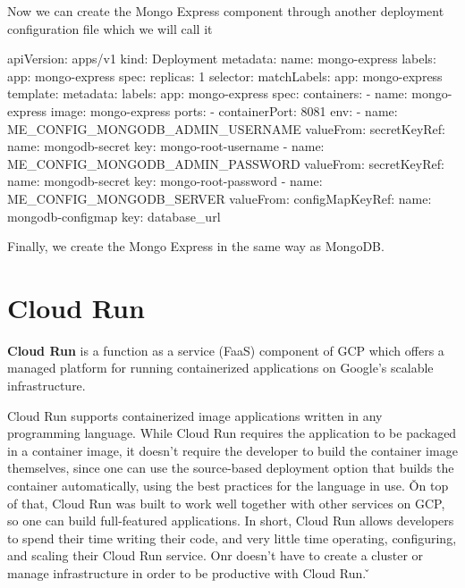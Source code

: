 Now we can create the Mongo Express component through another deployment configuration file which we will call it
\begin{block}
apiVersion: apps/v1
kind: Deployment
metadata:
  name: mongo-express
  labels:
    app: mongo-express
spec:
  replicas: 1
  selector:
    matchLabels:
      app: mongo-express
  template:
    metadata:
      labels:
        app: mongo-express
    spec:
      containers:
      - name: mongo-express
        image: mongo-express
        ports:
        - containerPort: 8081
        env:
        - name: ME_CONFIG_MONGODB_ADMIN_USERNAME
          valueFrom:
            secretKeyRef:
              name: mongodb-secret
              key: mongo-root-username
        - name: ME_CONFIG_MONGODB_ADMIN_PASSWORD
          valueFrom:
            secretKeyRef:
              name: mongodb-secret
              key: mongo-root-password
        - name: ME_CONFIG_MONGODB_SERVER
          valueFrom:
            configMapKeyRef:
              name: mongodb-configmap
              key: database_url
\end{block}

Finally, we create the Mongo Express in the same way as MongoDB\@.


\section{Cloud Run}

\textbf{Cloud Run} is a function as a service (FaaS) component of GCP which offers a managed platform for running
containerized applications on Google's scalable infrastructure.
\ed

Cloud Run supports containerized image applications written in any programming language. While Cloud Run requires the
application to be packaged in a container image, it doesn't require the developer to build the container image
themselves, since one can use the source-based deployment option that builds the container automatically, using the
best practices for the language in use. \v

On top of that, Cloud Run was built to work well together with other services on GCP, so one can build full-featured
applications. In short, Cloud Run allows developers to spend their time writing their code, and very little time
operating, configuring, and scaling their Cloud Run service. Onr doesn't have to create a cluster or manage
infrastructure in order to be productive with Cloud Run\@. \v


